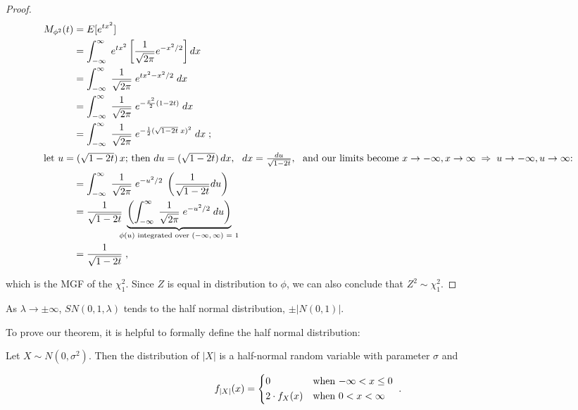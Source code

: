 \documentclass{article}
\begin{document}
\begin{proof}
  \begin{align*}
    M_{\phi^2}(t) &= E[e^{tx^2}] \\
    &= \int_{-\infty}^\infty \; e^{tx^2} \left[ \frac{1}{\sqrt{2\pi}} e^{-x^2/2} \right] dx \\
    &= \int_{-\infty}^\infty \; \frac{1}{\sqrt{2\pi}} \; e^{tx^2 - x^2/2} \; dx \\
    &= \int_{-\infty}^\infty \; \frac{1}{\sqrt{2\pi}} \; e^{-\frac{x^2}{2}(1 - 2t)} \; dx \\
    &= \int_{-\infty}^\infty \; \frac{1}{\sqrt{2\pi}} \; e^{-\frac{1}{2}(\sqrt{1-2t} \; x)^2} \; dx \;; \\
    \intertext{let $u = (\sqrt{1-2t}) \, x$; then $du = (\sqrt{1-2t}) \, dx$, \enspace $dx = \frac{du}{\sqrt{1-2t}}$, \enspace and our limits become $x \to -\infty, x \to \infty \Ra
      u \to -\infty, u \to \infty$:}
    &= \int_{-\infty}^\infty \; \frac{1}{\sqrt{2\pi}} \; e^{-u^2/2} \; \left( \frac{1}{\sqrt{1-2t}} du \right) \\
    &= \frac{1}{\sqrt{1-2t}} \; \underbrace{\left( \int_{-\infty}^\infty \; \frac{1}{\sqrt{2\pi}} \; e^{-u^2/2} \; du \right)}_{\mathclap{\textnormal{$\phi(u)$ integrated over
      $(-\infty,\infty)$ = 1}}} \label{phi-pdf} \\
    &= \frac{1}{\sqrt{1-2t}} \;,
  \end{align*}

  which is the MGF of the $\chi^2_1$. Since $Z$ is equal in distribution to
  $\phi$, we can also conclude that $Z^2 \sim \chi^2_1$. \end{proof}

\begin{property} \label{prop:3}
  As $\lambda \to \pm \infty$, \thinspace $SN(0,1,\lambda)$ tends to the half normal distribution, $\pm |N(0,1)|$.
\end{property}

To prove our theorem, it is helpful to formally define the half normal distribution:

\begin{helper-lem} \label{lem:p2-half-normal}
  Let $X \sim N(0, \sigma^2)$. Then the distribution of $|X|$ is a half-normal
  random variable with parameter $\sigma$ and

  \begin{equation*}
    f_{|X|}(x) =
    \begin{dcases*}
      0              & when $-\infty < x \leq 0$ \\
      2 \cdot f_X(x) & when $0 < x < \infty$ 
    \end{dcases*}
    .
  \end{equation*}
\end{helper-lem}
\end{document}
